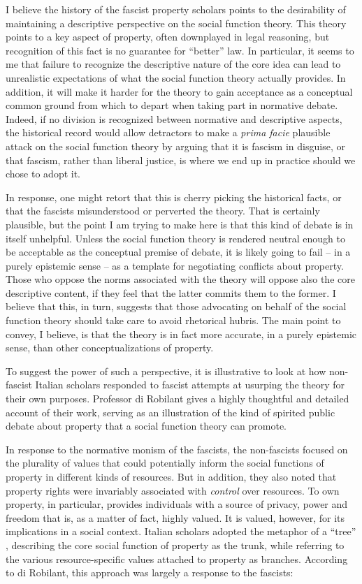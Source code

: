 I believe the history of the fascist property scholars points to the desirability of maintaining a descriptive perspective on the social function theory. This theory points to a key aspect of property, often downplayed in legal reasoning, but recognition of this fact is no guarantee for ``better'' law. In particular, it seems to me that failure to recognize the descriptive nature of the core idea can lead to unrealistic expectations of what the social function theory actually provides. In addition, it will make it harder for the theory to gain acceptance as a conceptual common ground from which to depart when taking part in normative debate. Indeed, if no division is recognized between normative and descriptive aspects, the historical record would allow detractors to make a {\it prima facie} plausible attack on the social function theory by arguing that it is fascism in disguise, or that fascism, rather than liberal justice, is where we end up in practice should we chose to adopt it. 

In response, one might retort that this is cherry picking the historical facts, or that the fascists misunderstood or perverted the theory. That is certainly plausible, but the point I am trying to make here is that this kind of debate is in itself unhelpful. Unless the social function theory is rendered neutral enough to be acceptable as the conceptual premise of debate, it is likely going to fail -- in a purely epistemic sense -- as a template for negotiating conflicts about property. Those who oppose the norms associated with the theory will oppose also the core descriptive content, if they feel that the latter commits them to the former. I believe that this, in turn, suggests that those advocating on behalf of the social function theory should take care to avoid rhetorical hubris. The main point to convey, I believe, is that the theory is in fact more accurate, in a purely epistemic sense, than other conceptualizations of property.

To suggest the power of such a perspective, it is illustrative to look at how non-fascist Italian scholars responded to fascist attempts at usurping the theory for their own purposes. Professor di Robilant gives a highly thoughtful and detailed account of their work, serving as an illustration of the kind of spirited public debate about property that a social function theory can promote. 

In response to the normative monism of the fascists, the non-fascists focused on the plurality of values that could potentially inform the social functions of property in different kinds of resources. But in addition, they also noted that property rights were invariably associated with {\it control} over resources. To own property, in particular, provides individuals with a source of privacy, power and freedom that is,  as a matter of fact, highly valued. It is valued, however, for its implications in a social context. Italian scholars adopted the metaphor of a ``tree'' , describing the core social function of property as the trunk, while referring to the various resource-specific values attached to property as branches. According to di Robilant, this approach was largely a response to the fascists:

